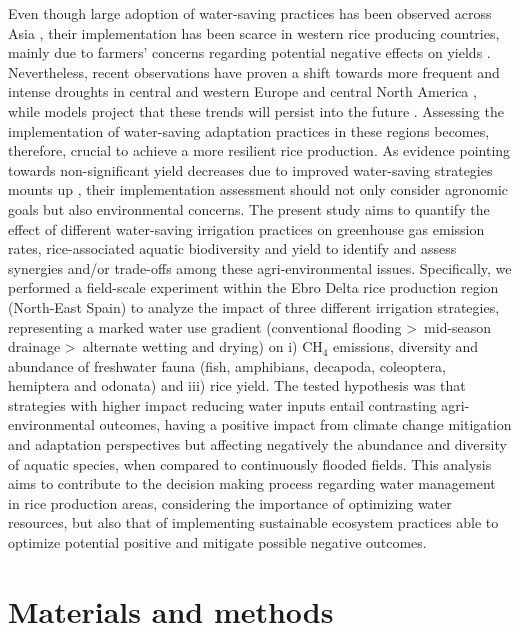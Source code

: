 Even though large adoption of water-saving practices has been observed across Asia \citep{lampayan2015}, their implementation has been scarce in western rice producing countries, mainly due to farmers' concerns regarding potential negative effects on yields \citep{carrijo2017}. Nevertheless, recent observations have proven a shift towards more frequent and intense droughts in central and western Europe and central North America \citep{masson2021ipcc}, while models project that these trends will persist into the future \citep{berg2018}. Assessing the implementation of water-saving adaptation practices in these regions becomes, therefore, crucial to achieve a more resilient rice production. As evidence pointing towards non-significant yield decreases due to improved water-saving strategies mounts up \citep{linquist2015, martinez-eixarch2021, monaco2021}, their implementation assessment should not only consider agronomic goals but also environmental concerns. The present study aims to quantify the effect of different water-saving irrigation practices on greenhouse gas emission rates, rice-associated aquatic biodiversity and yield to identify and assess synergies and/or trade-offs among these agri-environmental issues. Specifically, we performed a field-scale experiment within the Ebro Delta rice production region (North-East Spain) to analyze the impact of three different irrigation strategies, representing a marked water use gradient (conventional flooding \textgreater\ mid-season drainage \textgreater\ alternate wetting and drying) on i) CH$_{4}$ emissions, diversity and abundance of freshwater fauna (fish, amphibians, decapoda, coleoptera, hemiptera and odonata) and iii) rice yield. The tested hypothesis was that strategies with higher impact reducing water inputs entail contrasting agri-environmental outcomes, having a positive impact from climate change mitigation and adaptation perspectives but affecting negatively the abundance and diversity of aquatic species, when compared to continuously flooded fields. This analysis aims to contribute to the decision making process regarding water management in rice production areas, considering the importance of optimizing water resources, but also that of implementing sustainable ecosystem practices able to optimize potential positive and mitigate possible negative outcomes.

\section{Materials and methods}
\label{sec:meth}

